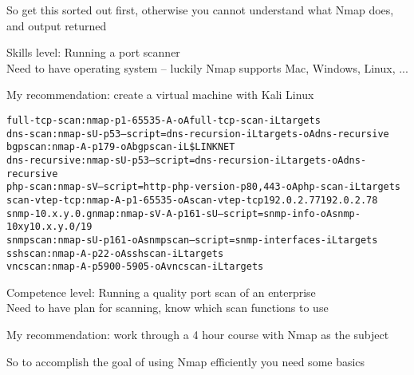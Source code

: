 \documentclass[Screen16to9,17pt]{foils}
\begin{document}
So get this sorted out first, otherwise you cannot understand what Nmap does, and output returned




\begin{list2}
\item Skills level: Running a port scanner\\
Need to have operating system -- luckily Nmap supports Mac, Windows, Linux, ...
\item My recommendation: create a virtual machine with Kali Linux
\end{list2}


\begin{alltt}\footnotesize
full-tcp-scan: nmap -p 1-65535 -A -oA full-tcp-scan -iL targets
dns-scan: nmap -sU -p 53 --script=dns-recursion -iL targets -oA dns-recursive
bgpscan: nmap -A -p 179 -oA bgpscan -iL \$LINKNET
dns-recursive: nmap -sU -p 53 --script=dns-recursion -iL targets -oA dns-recursive
php-scan: nmap -sV --script=http-php-version -p80,443 -oA php-scan -iL targets
scan-vtep-tcp: nmap -A -p 1-65535 -oA scan-vtep-tcp 192.0.2.77 192.0.2.78
snmp-10.x.y.0.gnmap: nmap -sV -A -p 161 -sU --script=snmp-info -oA snmp-10xy 10.x.y.0/19
snmpscan: nmap -sU -p 161 -oA snmpscan --script=snmp-interfaces -iL targets
sshscan: nmap -A -p 22 -oA sshscan -iL targets
vncscan: nmap -A -p 5900-5905 -oA vncscan -iL targets
\end{alltt}

\begin{list2}
\item Competence level: Running a quality port scan of an enterprise\\
Need to have plan for scanning, know which scan functions to use
\end{list2}

My recommendation: work through a 4 hour course with Nmap as the subject






So to accomplish the goal of using Nmap efficiently you need some basics
\end{document}

